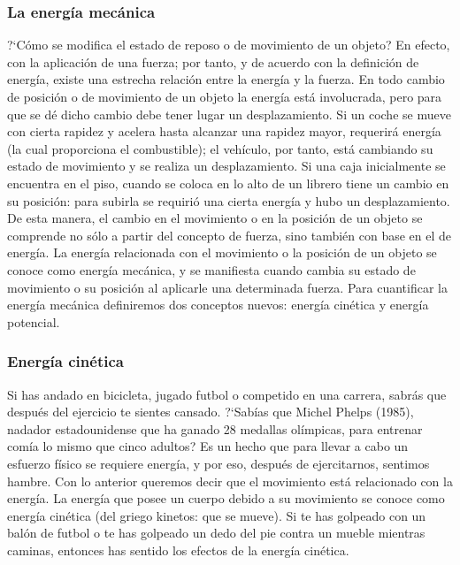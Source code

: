 \documentclass[11pt]{book}
\begin{document}
\subsubsection{La energ\'ia mec\'anica}
?`C\'omo se modifica el estado de reposo o de movimiento de un objeto? En efecto,
con la aplicaci\'on de una fuerza; por tanto, y de acuerdo con la definici\'on
de energ\'ia, existe una estrecha relaci\'on entre la energ\'ia y la fuerza. En todo
cambio de posici\'on o de movimiento de un objeto la energ\'ia est\'a involucrada,
pero para que se d\'e dicho cambio debe tener lugar un desplazamiento.
Si un coche se mueve con cierta rapidez y acelera hasta alcanzar una
rapidez mayor, requerir\'a energ\'ia (la cual proporciona el combustible); el
veh\'iculo, por tanto, est\'a cambiando su estado de movimiento y se realiza
un desplazamiento.
Si una caja inicialmente se encuentra en el piso, cuando se coloca en lo
alto de un librero tiene un cambio en su posici\'on: para subirla se requiri\'o
una cierta energ\'ia y hubo un desplazamiento.
De esta manera, el cambio en el movimiento o en la posici\'on de un objeto
se comprende no s\'olo a partir del concepto de fuerza, sino tambi\'en con base
en el de energ\'ia. La energ\'ia relacionada con el movimiento o la posici\'on de
un objeto se conoce como energ\'ia mec\'anica, y se manifiesta cuando cambia
su estado de movimiento o su posici\'on al aplicarle una determinada fuerza.
Para cuantificar la energ\'ia mec\'anica definiremos dos conceptos nuevos:
energ\'ia cin\'etica y energ\'ia potencial.

\subsubsection{Energ\'ia cin\'etica}
Si has andado en bicicleta, jugado futbol o competido en una carrera, sabr\'as
que despu\'es del ejercicio te sientes cansado. ?`Sab\'ias que Michel Phelps
(1985), nadador estadounidense que ha ganado 28 medallas ol\'impicas, para
entrenar com\'ia lo mismo que cinco adultos? Es un hecho que para llevar a
cabo un esfuerzo f\'isico se requiere energ\'ia, y por eso, despu\'es de
ejercitarnos, sentimos hambre. Con lo anterior queremos decir que el movimiento
est\'a relacionado con la energ\'ia. La energ\'ia que posee un cuerpo debido a
su movimiento se conoce como energ\'ia cin\'etica (del griego kinetos: que se
mueve). Si te has golpeado con un bal\'on de futbol o te has golpeado un dedo
del pie contra un mueble mientras caminas, entonces has sentido los efectos de
la energ\'ia cin\'etica.
\end{document}
